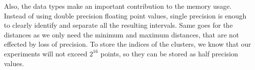 Also, the data types make an important contribution to the memory usage. Instead of using double precision floating point values, single precision is enough to clearly identify and separate all the resulting intervals. Same goes for the distances as we only need the minimum and maximum distances, that are not effected by loss of precision. To store the indices of the clusters, we know that our experiments will not exceed $2^{16}$ points, so they can be stored as half precision values.